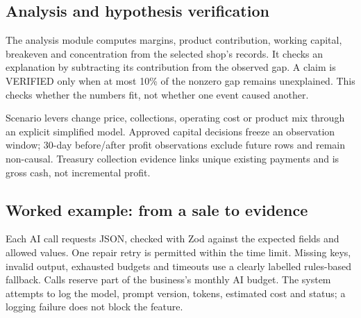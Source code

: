 \documentclass[10pt,a4paper]{article}
\begin{document}
\subsection*{Analysis and hypothesis verification}

The analysis module computes margins, product contribution, working capital, breakeven and concentration from the selected shop's records. It checks an explanation by subtracting its contribution from the observed gap. A claim is VERIFIED only when at most 10\% of the nonzero gap remains unexplained. This checks whether the numbers fit, not whether one event caused another.


Scenario levers change price, collections, operating cost or product mix through an explicit simplified model. Approved capital decisions freeze an observation window; 30-day before/after profit observations exclude future rows and remain non-causal. Treasury collection evidence links unique existing payments and is gross cash, not incremental profit.



\subsection*{Worked example: from a sale to evidence}


\clearpage


Each AI call requests JSON, checked with Zod against the expected fields and allowed values. One repair retry is permitted within the time limit. Missing keys, invalid output, exhausted budgets and timeouts use a clearly labelled rules-based fallback. Calls reserve part of the business's monthly AI budget. The system attempts to log the model, prompt version, tokens, estimated cost and status; a logging failure does not block the feature.
\end{document}
